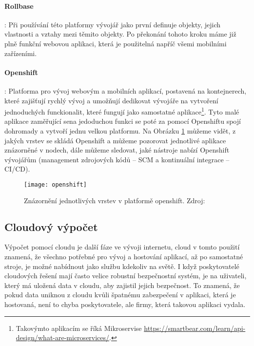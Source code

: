 \paragraph{Rollbase}: Při používání této platformy vývojář jako první definuje objekty, jejich vlastnosti a vztahy mezi těmito objekty. Po překonání tohoto kroku máme již plně funkční webovou aplikaci, která je použitelná napříč všemi mobilními zařízeními. \cite{what-is-low-code}
\paragraph{Openshift}: Platforma pro vývoj webovým a mobilních aplikací, postavená na kontejnerech, které zajišťují rychlý vývoj a umožňují dedikovat vývojáře na vytvoření jednoduchých funckionalit, které fungují jako samostatné aplikace\footnote{Takovýmto aplikacím se říká Mikroservise \url{https://smartbear.com/learn/api-design/what-are-microservices/}.}. Tyto malé aplikace zaměřující sena jedoduchou funkci se poté za pomocí Openshiftu spojí dohromady a vytvoří jednu velkou platformu. Na Obrázku \ref{openshift-vrstvy} můžeme vidět, z jakých vrstev se skládá Openshift a můžeme pozorovat jednotlivé aplikace znázorněné v nodech, dále můžeme sledovat, jaké nástroje nabízí Openshift vývojářům (management zdrojových kódů -- SCM a kontinuální integrace -- CI/CD).\cite{openshift-overview}
\begin{figure}[h]
\centering
\texttt{[image: openshift]}
\caption[Jednotlivé vrstev v platformě openshift]{Znázornění jednotlivých vrstev v platformě openshift. Zdroj: \cite{openshift-overview}}
\label{openshift-vrstvy}
\end{figure}

\subsection{Cloudový výpočet}
\par Výpočet pomocí cloudu je další fáze ve vývoji internetu, cloud v tomto použití znamená, že všechno potřebné pro vývoj a hostování aplikací, až po samostatné stroje, je možné nabídnout jako službu kdekoliv na světě. I když poskytovatelé cloudových řešení mají často velice robustní bezpečnostní systém, je na uživateli, který má uložená data v cloudu, aby zajistil jejich bezpečnost. To znamená, že pokud data uniknou z cloudu kvůli špatnému zabezpečení v aplikaci, která je hostovaná, není to chyba poskytovatele, ale firmy, která takovou aplikaci vydala.\cite{cloud-computing-dummies}

